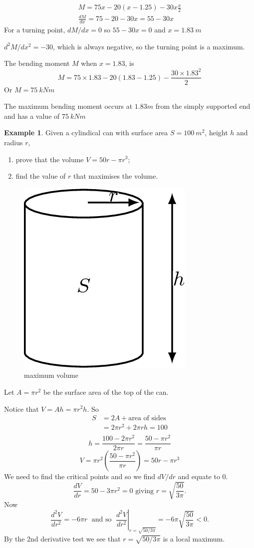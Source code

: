 \documentclass[
  11pt,
  oneside]{book}
\providecommand{\tightlist}{%
  \setlength{\itemsep}{0pt}\setlength{\parskip}{0pt}}
\newcommand{\slide}{}
\theoremstyle{definition}
\theoremstyle{definition}
\newtheorem{example}{Example}[chapter]
\theoremstyle{definition}
\theoremstyle{definition}
\theoremstyle{remark}
\begin{document}
\begin{gather*}
M = 75x - 20(x-1.25) - 30x\frac{x}{2}\\
\frac{dM}{dx} = 75-20-30x = 55 - 30x
\end{gather*}
For a turning point, \(dM/dx=0\) so \(55 - 30x = 0\) and \(x = 1.83\ m\)

\(d^2M/dx^2 = -30\), which is always negative, so the turning point is a maximum.

The bending moment \(M\) when \(x = 1.83\), is
\[
M = 75\times1.83 - 20(1.83 - 1.25) - \frac{30\times1.83^2}{2}
\]
Or \(M = 75\ kNm\)

The maximum bending moment occurs at \(1.83 m\) from the simply supported end and has a value of \(75\ kNm\)
\slide

\begin{example}

Given a cylindical can with surface area \(S=100\ m^2\), height \(h\) and radius \(r\),

\begin{enumerate}
\def\labelenumi{\arabic{enumi}.}
\tightlist
\item
  prove that the volume \(V = 50r-\pi r^3\);
\item
  find the value of \(r\) that maximises the volume.
\end{enumerate}

\end{example}

\begin{figure}

{\centering \includegraphics[width=0.25\linewidth]{tikztopng-figure15} 

}

\caption{maximum volume}\label{fig:unnamed-chunk-30}
\end{figure}

Let \(A=\pi r^2\) be the surface area of the top of the can.

Notice that \(V = Ah = \pi r^2h\). So
\[
\begin{array}{rl}
S&=2A + \text{area of sides}\\
&=2\pi r^2 + 2\pi rh = 100\\
\end{array}
\]
\[
h=\frac{100-2\pi r^2}{2\pi r}=\frac{50-\pi r^2}{\pi r}
\]
\[
V=\pi r^2\left(\frac{50-\pi r^2}{\pi r}\right) = 50r -\pi r^3
\]
We need to find the critical points and so we find \(dV/dr\) and equate to 0.
\[
\frac{dV}{dr} = 50-3\pi r^2 = 0\text{ giving }r = \sqrt{\frac{50}{3\pi}}.
\]
Now
\[
\frac{d^2V}{dr^2} = -6\pi r\;\text{ and so }\;\left.\frac{d^2V}{dr^2}\right\vert_{r=\sqrt{50/3\pi}} = -6\pi\sqrt{\frac{50}{3\pi}}<0.
\]
By the 2nd derivative test we see that \(r=\sqrt{50/3\pi}\) is a local maximum.
\end{document}
